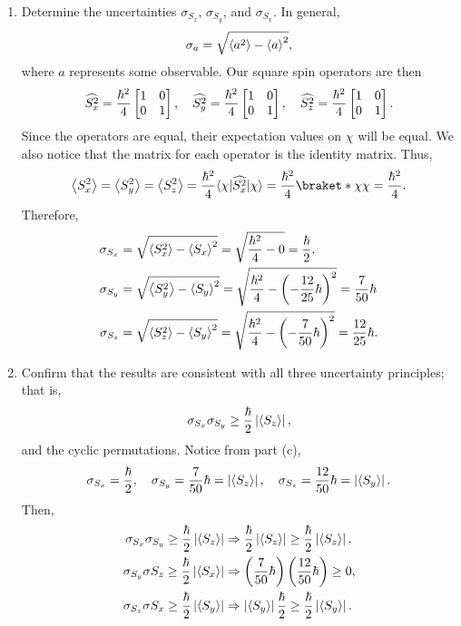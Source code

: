 \documentclass[a4paper, 12pt]{config/homework}
\begin{document}
\begin{enumerate}
\begin{enumerate}
\bigskip
\item Determine the uncertainties \(\sigma_{S_x}\), \(\sigma_{S_y}\), and \(\sigma_{S_x}\).
\bigskip
In general,
\[\sigma_a = \sqrt{\left\langle a^2 \right\rangle - \left\langle a \right\rangle^2},\]
where \(a\) represents some observable. Our square spin operators are then
\[
\widehat{S_x^2} = \frac{\hbar^2}{4}\left[ \begin{matrix} 1 & 0 \\ 0 & 1 \end{matrix} \right], \quad
\widehat{S_y^2} = \frac{\hbar^2}{4}\left[ \begin{matrix} 1 & 0 \\ 0 & 1 \end{matrix} \right], \quad
\widehat{S_z^2} = \frac{\hbar^2}{4}\left[ \begin{matrix} 1 & 0 \\ 0 & 1 \end{matrix} \right].
\]
Since the operators are equal, their expectation values on \(\chi\) will be equal. We also notice that the matrix for each operator is the identity matrix. Thus,
\[\expval{S_x^2} = \expval{S_y^2} = \expval{S_z^2} = \frac{\hbar^2}{4}\bra*{\chi}\widehat{S^2_x}\ket*{\chi} = \frac{\hbar^2}{4}\braket*{\chi}{\chi} = \frac{\hbar^2}{4}.\]
Therefore,
\begin{align*}
\sigma_{S_x} &= \sqrt{\left\langle S_x^2 \right\rangle - \left\langle S_x \right\rangle^2} = \sqrt{\frac{\hbar^2}{4}-0} = \frac{\hbar}{2}, \\
\sigma_{S_y} &= \sqrt{\left\langle S_y^2 \right\rangle - \left\langle S_y \right\rangle^2} = \sqrt{\frac{\hbar^2}{4} - \left(-\frac{12}{25}\hbar\right)^2} = \frac{7}{50}\hbar \\
\sigma_{S_z} &= \sqrt{\left\langle S_z^2 \right\rangle - \left\langle S_y \right\rangle^2} = \sqrt{\frac{\hbar^2}{4} - \left(-\frac{7}{50}\hbar\right)^2} = \frac{12}{25}\hbar.
\end{align*}

\bigskip
\item Confirm that the results are consistent with all three uncertainty principles; that is,
\[\sigma_{S_x}\sigma_{S_y} \ge \frac{\hbar}{2}\left|\left\langle S_z \right\rangle\right|,\]
and the cyclic permutations.
\bigskip
Notice from part (c),
\[
\sigma_{S_x} = \frac{\hbar}{2}, \quad
\sigma_{S_y} = \frac{7}{50}\hbar = \left|\left\langle S_z \right\rangle\right|, \quad
\sigma_{S_z} = \frac{12}{50}\hbar = \left|\left\langle S_y \right\rangle\right|.
\]
Then,
\begin{align*}
\sigma_{S_x}\sigma_{S_y} \ge \frac{\hbar}{2}\left|\left\langle S_z \right\rangle\right|
&\Rightarrow \frac{\hbar}{2}\left|\left\langle S_z \right\rangle\right| \ge \frac{\hbar}{2}\left|\left\langle S_z \right\rangle\right|, \\
\sigma_{S_y}\sigma{S_z} \ge \frac{\hbar}{2}\left|\left\langle S_x \right\rangle\right|
&\Rightarrow \left(\frac{7}{50}\hbar\right)\left(\frac{12}{50}\hbar\right) \ge 0, \\
\sigma_{S_z}\sigma{S_x} \ge \frac{\hbar}{2}\left|\left\langle S_y \right\rangle\right|
&\Rightarrow \left|\left\langle S_y \right\rangle\right|\frac{\hbar}{2} \ge \frac{\hbar}{2}\left|\left\langle S_y \right\rangle\right|.
\end{align*}


\end{enumerate}
\end{enumerate}
\end{document}
